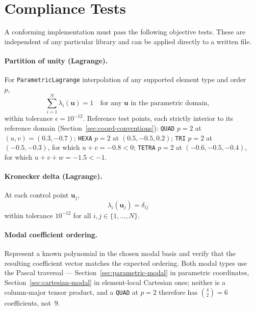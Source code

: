 \documentclass[11pt,letterpaper]{article}
\newif\ifvfourdraft
\newcommand{\vfour}[1]{\ifvfourdraft\textcolor{v4violet}{#1}\else#1\fi}
\begin{document}
\section{Compliance Tests}
\label{sec:compliance}

A conforming implementation must pass the following objective tests.  These are independent
of any particular library and can be applied directly to a written file.

\paragraph{Partition of unity (Lagrange).}
For \texttt{ParametricLagrange} interpolation of any supported element type and order $p$,
\begin{equation}
  \sum_{i=1}^{N} \lambda_i(\mathbf{u}) = 1
  \quad \text{for any } \mathbf{u} \text{ in the parametric domain},
\end{equation}
within tolerance $\epsilon = 10^{-12}$.  Reference test points, each strictly interior to
its reference domain (Section~\ref{sec:coord-conventions}): \texttt{QUAD} $p=2$ at
$(u,v)=(0.3, -0.7)$; \texttt{HEXA} $p=2$ at $(0.5, -0.5, 0.2)$; \texttt{TRI} $p=2$ at
$(-0.5, -0.3)$, for which $u+v = -0.8 < 0$; \texttt{TETRA} $p=2$ at $(-0.6, -0.5, -0.4)$,
for which $u+v+w = -1.5 < -1$.

\paragraph{Kronecker delta (Lagrange).}
At each control point $\mathbf{u}_j$,
\begin{equation}
  \lambda_i(\mathbf{u}_j) = \delta_{ij}
\end{equation}
within tolerance $10^{-12}$ for all $i, j \in \{1, \ldots, N\}$.

\paragraph{Modal coefficient ordering.}
Represent a known polynomial in the chosen modal basis and verify that the resulting
coefficient vector matches the expected ordering.  Both modal types use the Pascal
traversal --- Section~\ref{sec:parametric-modal} in parametric coordinates,
Section~\ref{sec:cartesian-modal} in element-local Cartesian ones; \vfour{neither
is a column-major tensor product, and a \texttt{QUAD} at $p=2$ therefore has
$\binom{4}{2}=6$ coefficients, not~$9$.}
\end{document}
